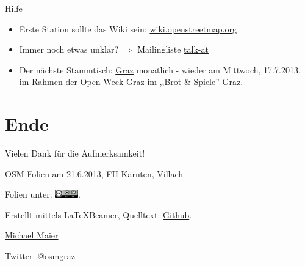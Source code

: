 \documentclass{beamer}
\begin{document}
\begin{frame}{Hilfe}

\begin{itemize}
  \item Erste Station sollte das Wiki sein: \href{http://wiki.openstreetmap.org}{wiki.openstreetmap.org}
  \item Immer noch etwas unklar? $\Rightarrow$ Mailingliste \href{http://lists.openstreetmap.org/listinfo/talk-at}{talk-at}
  \pause
  \item Der nächste Stammtisch: \href{http://wiki.openstreetmap.org/wiki/Graz/Stammtisch}{Graz} monatlich - wieder am Mittwoch, 17.7.2013, im Rahmen der Open Week Graz im ,,Brot \& Spiele'' Graz.
\end{itemize}

\end{frame}

\section{Ende}

\begin{frame}{Vielen Dank für die Aufmerksamkeit!}

  OSM-Folien am 21.6.2013, FH Kärnten, Villach
\vspace{1cm}

Folien unter: \includegraphics[width=1cm]{cc-by-sa.png}.
\vspace{1cm}

Erstellt mittels \LaTeX Beamer, Quelltext: \href{https://github.com/species/vortrag-osm-fh\_ktn\_6-2013}{Github}.
\vspace{1cm}

\href{mailto:michael.maier@student.tugraz.at}{Michael Maier}

Twitter: \href{https://twitter.com/osmgraz}{@osmgraz}
\end{frame}
\end{document}
